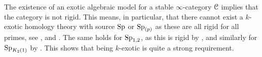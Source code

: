 \begin{remark}
    The existence of an exotic algebraic model for a stable $\infty$-category $\EuScript{C}$ implies that the category is not rigid. This means, in particular, that there cannot exist a $k$-exotic homology theory with source $\mathrm{Sp}$ or $\mathrm{Sp}_{(p)}$ as these are all rigid for all primes, see \cite{schwede_07}, \cite{schwede-schipley_02} and \cite{schwede_01}. The same holds for $\mathrm{Sp}_{1,2}$, as this is rigid by \cite{roitzheim_07}, and similarly for $\mathrm{Sp}_{K_2(1)}$ by \cite{ishak_19}. This shows that being $k$-exotic is quite a strong requirement. 
\end{remark}








